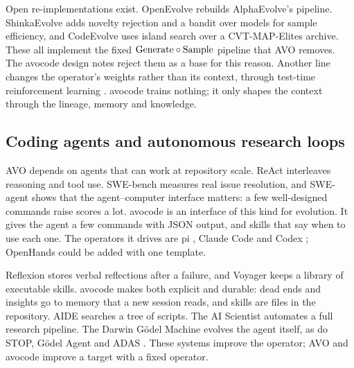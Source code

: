 Open re-implementations exist. OpenEvolve \citep{sharma2025openevolve} rebuilds AlphaEvolve's
pipeline. ShinkaEvolve \citep{lange2025shinkaevolve} adds novelty rejection and a bandit over
models for sample efficiency, and CodeEvolve \citep{assumpcao2025codeevolve} uses island search
over a CVT-MAP-Elites archive. These all implement the fixed $\mathrm{Generate} \circ \mathrm{Sample}$ pipeline that
AVO removes. The avocode design notes reject them as a base for this reason. Another line changes
the operator's weights rather than its context, through test-time reinforcement learning
\citep{yuksekgonul2026ttdiscover,yan2026pacevolve}. avocode trains nothing; it only shapes the
context through the lineage, memory and knowledge.

\subsection{Coding agents and autonomous research loops}

AVO depends on agents that can work at repository scale. ReAct \citep{yao2023react} interleaves
reasoning and tool use. SWE-bench \citep{jimenez2024swebench} measures real issue resolution, and
SWE-agent \citep{yang2024sweagent} shows that the agent--computer interface matters: a few
well-designed commands raise scores a lot. avocode is an interface of this kind for evolution. It
gives the agent a few commands with JSON output, and skills that say when to use each one. The
operators it drives are pi \citep{zechner2025pi}, Claude Code \citep{anthropic2025claudecode} and
Codex \citep{openai2025codexcli}; OpenHands \citep{wang2025openhands} could be added with one
template.

Reflexion \citep{shinn2023reflexion} stores verbal reflections after a failure, and Voyager
\citep{wang2023voyager} keeps a library of executable skills. avocode makes both explicit and
durable: dead ends and insights go to memory that a new session reads, and skills are files in the
repository. AIDE \citep{jiang2025aide} searches a tree of scripts. The AI Scientist
\citep{lu2024aiscientist,yamada2025aiscientistv2} automates a full research pipeline. The Darwin
G\"odel Machine \citep{zhang2025dgm} evolves the agent itself, as do STOP, G\"odel Agent and ADAS
\citep{zelikman2023stop,yin2024godelagent,hu2025adas}. These systems improve the operator; AVO and
avocode improve a target with a fixed operator.

